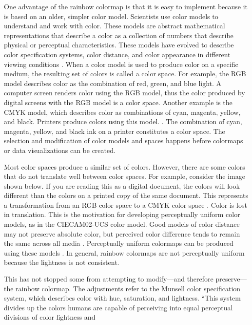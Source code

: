 \documentclass[journal]{IEEEtran}
\begin{document}
\par
One advantage of the rainbow colormap is that it is easy to implement because it
is based on an older, simpler color model. Scientists use color models to understand
and work with color. These models are abstract mathematical representations that
describe a color as a collection of numbers that describe physical or perceptual
characteristics. These models have evolved to describe color specification systems,
color distance, and color appearance in different viewing conditions \cite{ciecam02}.
When a color model is used to produce color on a specific medium, the resulting set
of colors is called a color space. For example, the RGB model
describes color as the combination of red, green, and
blue light. A computer screen renders color using the
RGB model, thus the color produced by digital screens
with the RGB model is a color space. Another example is the
CMYK model, which describes color as combinations of
cyan, magenta, yellow, and black. Printers produce colors using this model.
\cite{colorimetry,colormapping}. The combination of cyan, magenta, yellow, and black
ink on a printer constitutes a color space. The selection and modification of color
models and spaces happens before colormaps or data visualizations can be created. 
\par
Most color spaces produce a similar set of colors. However, there are some colors
that do not translate well between color spaces. For example, consider the image
shown below. If you are reading this as a digital document, the colors will look
different than the colors on a printed copy of the same document. This represents
a transformation from an RGB color space to a CMYK color space \cite{colorvblackwhite}.
Color is lost in translation. This is the motivation for developing perceptually
uniform color models, as in the CIECAM02-UCS color model. Good models of color
distance may not preserve absolute color, but perceived color difference tends
to remain the same across all media \cite{ciecam02}. Perceptually uniform colormaps
can be produced using these models \cite{viridis}. In general, rainbow colormaps
are not perceptually uniform because the lightness is not consistent.
\par
This has not stopped some from attempting to modify---and therefore preserve---the
rainbow colormap. The adjustments refer to the Munsell color specification system,
which describes color with hue, saturation, and lightness. “This system
divides up the colors humans are capable of perceiving
into equal perceptual divisions of color lightness and
\end{document}
